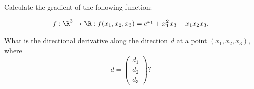 
Calculate the gradient of the following function:

 \[f:\R^3 \to \R: f(x_1,x_2,x_3)= e^{x_1} + x_1^2x_3 -x_1x_2x_3.\]

What is 
the directional derivative along the direction $d$ at a point $(x_1,
x_2, x_3)$, where
\[
d = 
\begin{pmatrix}
    d_1 \\
    d_2 \\
    d_3
\end{pmatrix}?
\]



